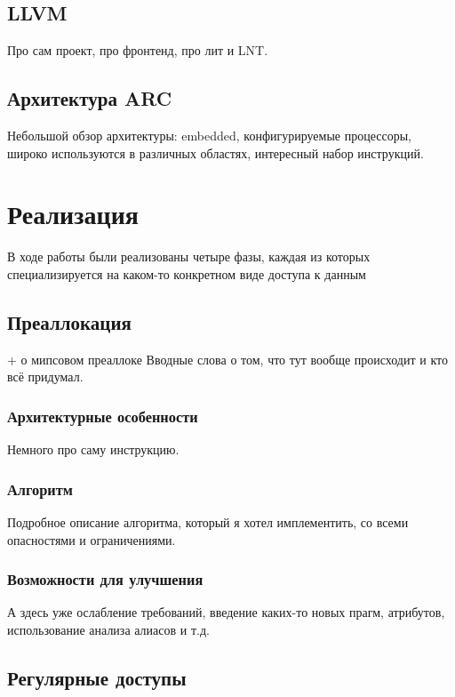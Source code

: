 \documentclass[12pt,a4paper]{article}
\begin{document}
\subsection{LLVM}

Про сам проект, про фронтенд, про лит и LNT.

\subsection{Архитектура ARC}

Небольшой обзор архитектуры: embedded, конфигурируемые процессоры, широко используются в различных областях, интересный набор инструкций.

\section{Реализация}

В ходе работы были реализованы четыре фазы, каждая из которых специализируется на каком-то конкретном виде доступа к данным

\subsection{Преаллокация}

+ о мипсовом преаллоке
Вводные слова о том, что тут вообще происходит и кто всё придумал.

\subsubsection{Архитектурные особенности}

Немного про саму инструкцию.

\subsubsection{Алгоритм}

Подробное описание алгоритма, который я хотел имплементить, со всеми опасностями и ограничениями.

\subsubsection{Возможности для улучшения}

А здесь уже ослабление требований, введение каких-то новых прагм, атрибутов, использование анализа алиасов и т.д.

\subsection{Регулярные доступы}
\end{document}
